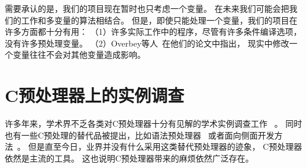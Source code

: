 需要承认的是，我们的项目现在暂时也只考虑一个变量。
在未来我们可能会把我们的工作和多变量的算法相结合。
但是，即使只能处理一个变量，我们的项目在许多方面都十分有用：
（1）许多实际工作中的程序，尽管有许多条件编译选项，没有许多预处理变量。
（2）Overbey等人~\parencite{Overbey2014}在他们的论文中指出，
现实中修改一个变量往往不会对其他变量造成影响。




%
%

\section{C预处理器上的实例调查}
许多年来，学术界不乏各类对C预处理器十分有见解的学术实例调查工作
~\parencite{Spencer92,ernst2002empirical,Liebig2011}。
同时也有一些C预处理的替代品被提出，比如语法预处理器~\parencite{Weise1993,McCloskey:2005}
或者面向侧面开发方法~\parencite{Lohmann2006,Adams2009,Boucher2010}。
但是直至今日，业界并没有什么采用这类替代预处理器的迹象，
C预处理器依然是主流的工具。
这也说明C预处理器带来的麻烦依然广泛存在。




